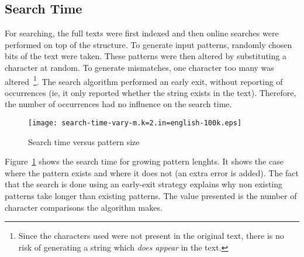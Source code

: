 \subsection{Search Time}

For searching, the full texts were first indexed and then online searches were performed on top of the structure. To generate input patterns, randomly chosen bits of the text were taken. These patterns were then altered by substituting a character at random. To generate mismatches, one character too many was altered~\footnote{Since the characters used were not present in the original text, there is no risk of generating a string which \emph{does appear} in the text.}. The search algorithm performed an early exit, without reporting of occurrences (ie, it only reported whether the string exists in the text). Therefore, the number of occurrences had no influence on the search time.

\begin{figure}
\texttt{[image: search-time-vary-m.k=2.in=english-100k.eps]}
\caption{Search time versus pattern size}\label{fig:search-vary-m}
\end{figure}

Figure~\ref{fig:search-vary-m} shows the search time for growing pattern lenghts. It shows the case where the pattern exists and where it does not (an extra error is added). The fact that the search is done using an early-exit strategy explains why non existing patterns take longer than existing patterns. The value presented is the number of character comparisons the algorithm makes.
